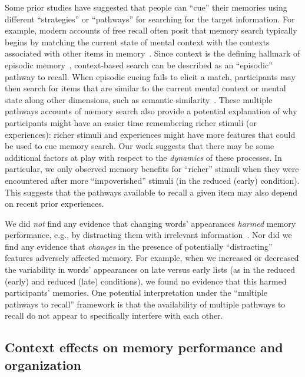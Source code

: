 \documentclass[11pt]{article}
\begin{document}
Some prior studies have suggested that people can ``cue'' their memories using
different ``strategies'' or ``pathways'' for searching for the target
information. For example, modern accounts of free recall often posit that
memory search typically begins by matching the current state of mental context
with the contexts associated with other items in memory~\citep{Kaha20}. Since
context is the defining hallmark of episodic memory~\citep{Tulv83},
context-based search can be described as an ``episodic'' pathway to recall.
When episodic cueing fails to elicit a match, participants may then search for
items that are similar to the current mental context or mental state along
other dimensions, such as semantic similarity~\citep{DavaEtal03, SochEtal09}.
These multiple pathways accounts of memory search also provide a potential
explanation of why participants might have an easier time remembering richer
stimuli (or experiences): richer stimuli and experiences might have more
features that could be used to cue memory search. Our work suggests that there
may be some additional factors at play with respect to the \textit{dynamics} of
these processes. In particular, we only observed memory benefits for ``richer''
stimuli when they were encountered after more ``impoverished'' stimuli (in the
reduced (early) condition). This suggests that the pathways available to recall
a given item may also depend on recent prior experiences.

We did \textit{not} find any evidence that changing words' appearances
\textit{harmed} memory performance, e.g., by distracting them with irrelevant
information~\citep{MarsEtal15, Lang05, MarsEtal12, ReinEtal92}. Nor did we find
any evidence that \textit{changes} in the presence of potentially
``distracting'' features adversely affected memory. For example, when we
increased or decreased the variability in words' appearances on late versus
early lists (as in the reduced (early) and reduced (late) conditions), we found
no evidence that this harmed participants' memories. One potential
interpretation under the ``multiple pathways to recall'' framework is that the
availability of multiple pathways to recall do not appear to specifically
interfere with each other.

\subsection*{Context effects on memory performance and organization}
\end{document}
